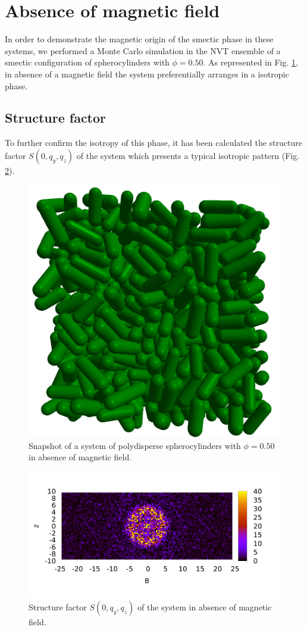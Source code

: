 \documentclass{article}
\begin{document}
\section{Absence of magnetic field}

In order to demonstrate the magnetic origin of the smectic phase in these systems, we performed a Monte Carlo simulation in the NVT ensemble of a smectic configuration of spherocylinders with $\phi = 0.50$. As represented in Fig. \ref{fig:noB_snapshot}, in absence of a magnetic field the system preferentially arranges in a isotropic phase.

\subsection{Structure factor}
To further confirm the isotropy of this phase, it has been calculated the structure factor $S(0, q_y, q_z)$ of the system which presents a typical isotropic pattern (Fig. \ref{fig:Syz_noB}).


\begin{figure}
    \centering
    \includegraphics[width=0.5\columnwidth]{Isotropic_phase_snap.png}
    \caption{Snapshot of a system of polydisperse spherocylinders with $\phi = 0.50$ in absence of magnetic field.}
    \label{fig:noB_snapshot}
\end{figure}

\begin{figure}
    \centering
    \includegraphics[width=1.1\columnwidth]{Syz_noB.png}
    \caption{Structure factor $S(0, q_y, q_z)$ of the system in absence of magnetic field.}
    \label{fig:Syz_noB}
\end{figure}
\end{document}
